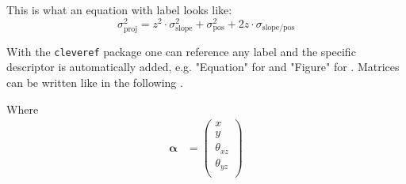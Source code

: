 This is what an equation with label looks like:
\begin{equation}
    \sigma_\mathrm{proj}^2 = z^2 \cdot \sigma_\mathrm{slope}^2 + \sigma_\mathrm{pos}^2 + 2 z \cdot \sigma_\mathrm{slope/pos}
    \label{eq:track_projection_sigma}
\end{equation}

With the \texttt{cleveref} package one can reference any label and the specific descriptor is automatically added, e.g. "Equation" for  and "Figure" for .
Matrices can be written like in the following .

Where
\begin{align}
    \boldsymbol{\alpha} &= \begin{pmatrix}
                    x \\
                    y \\
                    \theta_{xz}\\
                    \theta_{yz}\\
                   \end{pmatrix}
\label{eg:matrix_example}
\end{align}